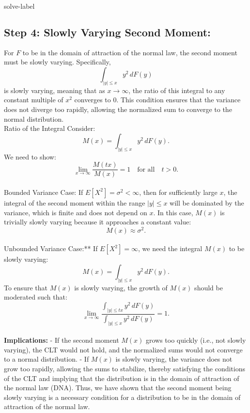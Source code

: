 \begin{solve}{}{solve-label}
\subsection*{Step 4: Slowly Varying Second Moment:}
For \( F \) to be in the domain of attraction of the normal law, the second moment must be slowly varying. Specifically, \[ \int_{|y| \leq x} y^2 \, dF(y) \] is slowly varying, meaning that as \( x \to \infty \), the ratio of this integral to any constant multiple of \( x^2 \) converges to 0. This condition ensures that the variance does not diverge too rapidly, allowing the normalized sum to converge to the normal distribution. 
 \\ Ratio of the Integral Consider: \[ M(x) = \int_{|y| \leq x} y^2 \, dF(y). \] We need to show: \[ \lim_{x \to \infty} \frac{M(tx)}{M(x)} = 1 \quad \text{for all} \quad t > 0. \] \\
 Bounded Variance Case: If \( E[X^2] = \sigma^2 < \infty \), then for sufficiently large \( x \), the integral of the second moment within the range \( |y| \leq x \) will be dominated by the variance, which is finite and does not depend on \( x \). In this case, \( M(x) \) is trivially slowly varying because it approaches a constant value: \[ M(x) \approx \sigma^2. \] \\
 Unbounded Variance Case:** If \( E[X^2] = \infty \), we need the integral \( M(x) \) to be slowly varying: \[ M(x) = \int_{|y| \leq x} y^2 \, dF(y). \] To ensure that \( M(x) \) is slowly varying, the growth of \( M(x) \) should be moderated such that: \[ \lim_{x \to \infty} \frac{\int_{|y| \leq tx} y^2 \, dF(y)}{\int_{|y| \leq x} y^2 \, dF(y)} = 1. \] \\
  \textbf{Implications:} - If the second moment \( M(x) \) grows too quickly (i.e., not slowly varying), the CLT would not hold, and the normalized sums would not converge to a normal distribution. - If \( M(x) \) is slowly varying, the variance does not grow too rapidly, allowing the sums to stabilize, thereby satisfying the conditions of the CLT and implying that the distribution is in the domain of attraction of the normal law (DNA). Thus, we have shown that the second moment being slowly varying is a necessary condition for a distribution to be in the domain of attraction of the normal law.\\
 \cite{r1,r2,r3,r4,r5,r6,r7}
	\end{solve}
	
	
	
	
	
